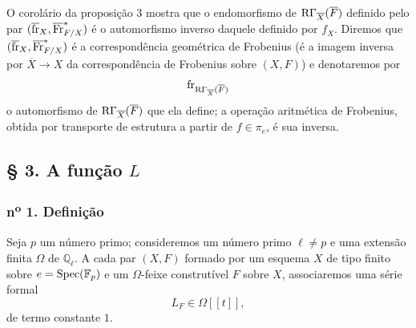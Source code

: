 O corolário da proposição 3 mostra que o endomorfismo de $\mathrm{R}\Gamma_{\overline X}(\overline F)$ definido pelo par $(\overline{\operatorname{fr}}_X,\overline{\operatorname{Fr}}^*_{F/X})$ é o automorfismo inverso daquele definido por $f_X$. Diremos que $(\overline{\operatorname{fr}}_X,\overline{\operatorname{Fr}}^*_{F/X})$ é a correspondência geométrica de Frobenius (é a imagem inversa por $\overline X\to X$ da correspondência de Frobenius sobre $(X,F)$) e denotaremos por
\[
\operatorname{fr}_{\mathrm{R}\Gamma_{\overline X}(\overline F)}
\]
o automorfismo de $\mathrm{R}\Gamma_{\overline X}(\overline F)$ que ela define; a operação aritmética de Frobenius, obtida por transporte de estrutura a partir de $f\in\pi_e$, é sua inversa.

\subsection*{§ 3. A função $L$}

\subsubsection*{n\textsuperscript{o} 1. Definição}

Seja $p$ um número primo; consideremos um número primo $\ell\ne p$ e uma extensão finita $\Omega$ de $\mathbb Q_\ell$. A cada par $(X,F)$ formado por um esquema $X$ de tipo finito sobre $e=\operatorname{Spec}(\mathbb F_p)$ e um $\Omega$-feixe construtível $F$ sobre $X$, associaremos uma série formal
\[
L_F\in\Omega[[t]],
\]
de termo constante $1$.


